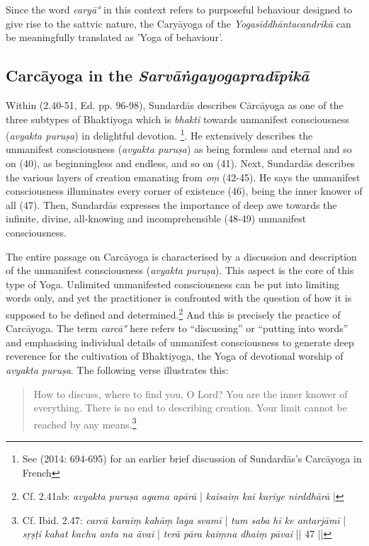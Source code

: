  Since the word \textit{caryā°} in this context refers to purposeful behaviour designed to give rise to the sattvic nature, the Caryāyoga of the \textit{Yogasiddhāntacandrikā} can be meaningfully translated as 'Yoga of behaviour'.  

\subsection{Carcāyoga in the \textit{Sarvāṅgayogapradīpikā}}
\label{carcasarvanga}
Within  (2.40-51, Ed. pp. 96-98), Sundardās describes Cārcāyoga as one of the three subtypes of Bhaktiyoga which is \textit{bhakti} towards unmanifest consciousness (\textit{avyakta puruṣa}) in delightful devotion. \footnote{See \citeauthor{burger2014sarvangayogapradipika} (2014: 694-695) for an earlier brief discussion of Sundardās's Carcāyoga in French}. He extensively describes the unmanifest consciousness (\textit{avyakta puruṣa}) as being formless and eternal and so on (40), as beginningless and endless, and so on (41). Next, Sundardās describes the various layers of creation emanating from \textit{oṃ} (42-45). He says the unmanifest consciousness illuminates every corner of existence (46), being the inner knower of all (47). Then, Sundardās expresses the importance of deep awe towards the infinite, divine, all-knowing and incomprehensible (48-49) unmanifest consciousness.

The entire passage on Carcāyoga is characterised by a discussion and description of the unmanifest consciousness (\textit{avyakta puruṣa}). This aspect is the core of this type of Yoga. Unlimited unmanifested consciousness can be put into limiting words only, and yet the practitioner is confronted with the question of how it is supposed to be defined and determined.\footnote{Cf.  2.41ab: \textit{avyakta puruṣa agama apārā} | \textit{kaisaiṃ kai kariye nirddhārā} |} And this is precisely the practice of Carcāyoga. The term \textit{carcā°} here refers to ``discussing'' or ``putting into words'' and emphasising individual details of unmanifest consciousness to generate deep reverence for the cultivation of Bhaktiyoga, the Yoga of devotional worship of \textit{avyakta puruṣa}. The following verse illustrates this:
\begin{quote}
How to discuss, where to find you, O Lord? You are the inner knower of everything. There is no end to describing creation. Your limit cannot be reached by any means.\footnote{Cf. Ibid. 2.47: \textit{carcā karaiṃ kahāṃ laga svamī} | \textit{tum saba hī ke antarjāmī} | \textit{sṛṣṭi kahat kachu anta na āvai} | \textit{terā pāra kaiṃna dhaiṃ pāvai} || 47 ||} \end{quote}

